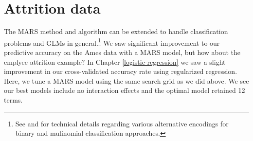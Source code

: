 \documentclass[]{krantz}
\makeatletter
\newenvironment{Shaded}{\begin{snugshade}}{\end{snugshade}}
\newcommand{\CommentTok}[1]{\textcolor[rgb]{0.37,0.37,0.37}{\textit{#1}}}
\newcommand{\DataTypeTok}[1]{\textcolor[rgb]{0.27,0.27,0.27}{#1}}
\newcommand{\DecValTok}[1]{\textcolor[rgb]{0.06,0.06,0.06}{#1}}
\newcommand{\FloatTok}[1]{\textcolor[rgb]{0.06,0.06,0.06}{#1}}
\newcommand{\KeywordTok}[1]{\textcolor[rgb]{0.27,0.27,0.27}{\textbf{#1}}}
\newcommand{\NormalTok}[1]{#1}
\newcommand{\OperatorTok}[1]{\textcolor[rgb]{0.43,0.43,0.43}{\textbf{#1}}}
\newcommand{\OtherTok}[1]{\textcolor[rgb]{0.37,0.37,0.37}{#1}}
\newcommand{\StringTok}[1]{\textcolor[rgb]{0.5,0.5,0.5}{#1}}
\newenvironment{kframe}{%
\medskip{}
\setlength{\fboxsep}{.8em}
 \def\at@end@of@kframe{}%
 \ifinner\ifhmode%
  \def\at@end@of@kframe{\end{minipage}}%
  \begin{minipage}{\columnwidth}%
 \fi\fi%
 \def\FrameCommand##1{\hskip\@totalleftmargin \hskip-\fboxsep
 \colorbox{shadecolor}{##1}\hskip-\fboxsep
     \hskip-\linewidth \hskip-\@totalleftmargin \hskip\columnwidth}%
 \MakeFramed {\advance\hsize-\width
   \@totalleftmargin\z@ \linewidth\hsize
   \@setminipage}}%
 {\par\unskip\endMakeFramed%
 \at@end@of@kframe}
\renewenvironment{Shaded}{\begin{kframe}}{\end{kframe}}
\makeatother
\begin{document}
\hypertarget{attrition-data-1}{%
\section{Attrition data}\label{attrition-data-1}}

The MARS method and algorithm can be extended to handle classification problems and GLMs in general.\footnote{See \citet{esl} and \citet{stone1997polynomial} for technical details regarding various alternative encodings for binary and mulinomial classification approaches.} We saw significant improvement to our predictive accuracy on the Ames data with a MARS model, but how about the emplyee attrition example? In Chapter \ref{logistic-regression} we saw a slight improvement in our cross-validated accuracy rate using regularized regression. Here, we tune a MARS model using the same search grid as we did above. We see our best models include no interaction effects and the optimal model retained 12 terms.

\begin{Shaded}
\end{Shaded}
\end{document}
